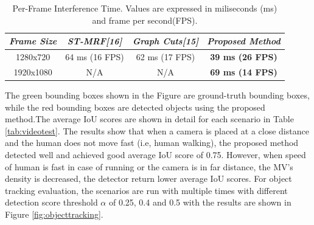 \begin{table}[]
\centering
\caption{Per-Frame Interference Time. Values are expressed in miliseconds (ms) and frame per second(FPS).}
\label{tab:timemessasure}
\begin{tabular}{|c|c|c|c|}
\hline
\textit{Frame Size} & \textit{ST-MRF{[}16{]}} & \textit{Graph Cuts{[}15{]}} & \textit{Proposed Method} \\ \hline
1280x720            & 64 ms (16 FPS)         & 62 ms (17 FPS)              & \textbf{39 ms (26 FPS)}  \\ \hline
1920x1080           & N/A                    & N/A                        & \textbf{69 ms (14 FPS)}  \\ \hline
\end{tabular}
\end{table}
The green bounding boxes shown in the Figure are ground-truth bounding boxes, while the red bounding boxes are detected objects using the proposed method.The average IoU scores are shown in detail for each scenario in Table \ref{tab:videotest}. The results show that when a camera is placed at a close distance and the human does not move fast (i.e, human walking), the proposed method detected well and achieved good average IoU score of 0.75. However, when speed of human is fast in case of running or the camera is in far distance, the MV's density is decreased, the detector return lower average IoU scores. For object tracking evaluation, the scenarios are run with multiple times with different detection score threshold $\alpha$ of 0.25, 0.4 and 0.5 with the results are shown in Figure  \ref{fig:objecttracking}. 
